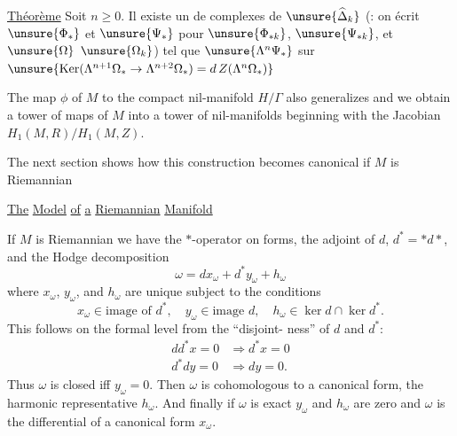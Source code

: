 \uline{Théorème} Soit $n\geq0$. Il existe un 
de complexes de  $\unsure{\widehat\Delta_k}$
(: on écrit $\unsure{\Phi_*}$ et $\unsure{\Psi_*}$ pour
$\unsure{\Phi_{* k}}$, $\unsure{\Psi_{* k}}$, et $\unsure{\Omega}$
 $\unsure{\Omega_k}$) tel que 
$\unsure{\Lambda^n\Psi_*}$ sur
$\unsure{\operatorname{Ker}(\Lambda^{n+1}\Omega_*\to\Lambda^{n+2}\Omega_*)
=d\,Z(\Lambda^n\Omega_*)}$

The map $\phi$ of $M$ to the compact nil-manifold $H/\Gamma$
also generalizes and we obtain a tower of maps of $M$
into a tower of nil-manifolds beginning with the Jacobian
$H_1(M,R)/H_1(M,Z)$.

The next section shows how this construction becomes
canonical if $M$ is Riemannian

\begin{center}\uline{The} \uline{Model} \uline{of} \uline{a} \uline{Riemannian} \uline{Manifold}\end{center}

If $M$ is Riemannian we have the $*$-operator on forms,
the adjoint of $d$, $d^*=*d*$, and the Hodge decomposition
\[
\omega=dx_\omega+d^*y_\omega+h_\omega
\]
where $x_\omega$, $y_\omega$, and $h_\omega$ are unique subject to the conditions
\[
x_\omega\in\text{image of }d^*,\quad y_\omega\in\text{image }d,\quad
h_\omega\in\ker d\cap\ker d^*.
\]
This follows on the formal level from the ``disjoint-
ness'' of $d$ and $d^*$:
\[
\begin{aligned}
dd^*x=0&\Rightarrow d^*x=0\\
d^*dy=0&\Rightarrow dy=0.
\end{aligned}
\]
Thus $\omega$ is closed iff $y_\omega=0$. Then $\omega$ is cohomologous
to a canonical form, the harmonic representative $h_\omega$.
And finally if $\omega$ is exact $y_\omega$ and $h_\omega$ are zero and $\omega$ is the
differential of a canonical form $x_\omega$.

